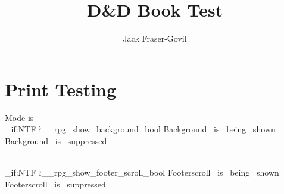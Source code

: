 \documentclass[theme=dnd,size=9pt]{rpgbook}
\title{D\&D Book Test}
\author{Jack Fraser-Govil}
\begin{document}
   


\chapter{Print Testing}

Mode is \csPrintMode \\


\ExplSyntaxOn
\bool_if:NTF \l__rpg_show_background_bool
{
	Background~ is~ being~ shown
}
{
	Background~ is~ suppressed
}

\\

\bool_if:NTF \l__rpg_show_footer_scroll_bool
{
	Footerscroll~ is~ being~ shown
}
{
	Footerscroll~ is~ suppressed
}



\ExplSyntaxOff
\end{document}
